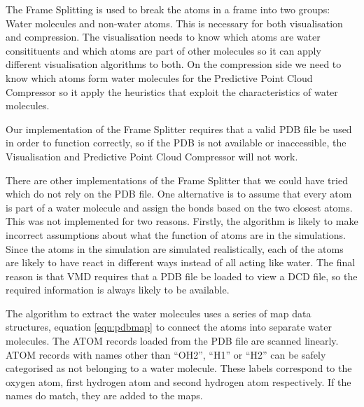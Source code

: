 \documentclass[a4paper,11pt]{report}
\begin{document}
The Frame Splitting is used to break the atoms in a frame into two groups: Water molecules and non-water atoms. This is necessary for both visualisation and compression. The visualisation needs to know which atoms are water consitituents and which atoms are part of other molecules so it can apply different visualisation algorithms to both. On the compression side we need to know which atoms form water molecules for the Predictive Point Cloud Compressor so it apply the heuristics that exploit the characteristics of water molecules.

Our implementation of the Frame Splitter requires that a valid PDB file be used in order to function correctly, so if the PDB is not available or inaccessible, the Visualisation and Predictive Point Cloud Compressor will not work. 

There are other implementations of the Frame Splitter that we could have tried which do not rely on the PDB file. One alternative is to assume that every atom is part of a water molecule and assign the bonds based on the two closest atoms. This was not implemented for two reasons. Firstly, the algorithm is likely to make incorrect assumptions about what the function of atoms are in the simulations. Since the atoms in the simulation are simulated realistically, each of the atoms are likely to have react in different ways instead of all acting like water. The final reason is that VMD requires that a PDB file be loaded to view a DCD file, so the required information is always likely to be available.

The algorithm to extract the water molecules uses a series of map data structures, equation \ref{eqn:pdbmap} to connect the atoms into separate water molecules. The ATOM records loaded from the PDB file are scanned linearly. ATOM records with names other than ``OH2'', ``H1'' or ``H2'' can be safely categorised as not belonging to a water molecule. These labels correspond to the oxygen atom, first hydrogen atom and second hydrogen atom respectively. If the names do match, they are added to the maps. 

%   


\end{document}
